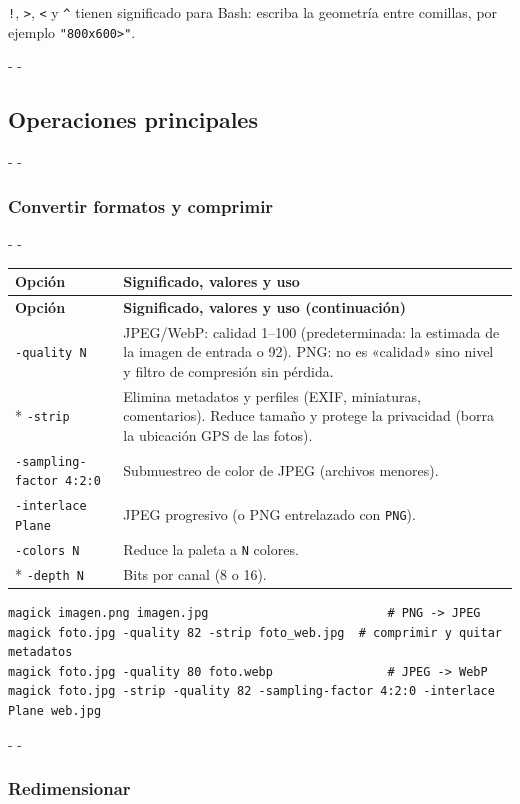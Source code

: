 \documentclass[11pt,a4paper]{article}
\makeatletter
\newcommand{\necesitaespacio}[1]{\par\penalty-100\begingroup
	\setlength{\dimen@}{#1}\dimen@ii\pagegoal\advance\dimen@ii-\pagetotal
	\ifdim\dimen@>\dimen@ii\ifdim\dimen@ii>\z@\vfil\fi\penalty-\@M\fi\endgroup}
\newenvironment{opciones}[1][Opción]{%
	\par\begingroup\small
	\begin{longtable}{L{4.25cm}L{11.2cm}}
		\toprule\rowcolor{tablacab}\cab{#1} & \cab{Significado, valores y uso} \\ \midrule
		\endfirsthead
		\toprule\rowcolor{tablacab}\cab{#1} & \cab{Significado, valores y uso (continuación)} \\ \midrule
		\endhead
		\bottomrule
		\endfoot}
	{\end{longtable}\endgroup}
\newcommand{\opt}[1]{\texttt{\textcolor{colopt}{#1}}}      %
\newcommand{\val}[1]{\texttt{#1}}                          %
\newcommand{\cab}[1]{\textbf{#1}}
\makeatother
\begin{document}
	\begin{advertencia}
		\val{!}, \val{>}, \val{<} y \val{\^{}} tienen significado para Bash: escriba la geometría entre comillas, por ejemplo \val{"800x600>"}.
	\end{advertencia}
	
	\necesitaespacio{25\baselineskip}
	\subsection{Operaciones principales}
	
	\necesitaespacio{22\baselineskip}
	\subsubsection{Convertir formatos y comprimir}
	
	\necesitaespacio{18\baselineskip}
	\begin{opciones}
		\opt{-quality N} & JPEG/WebP: calidad 1--100 (predeterminada: la estimada de la imagen de entrada o 92). PNG: no es «calidad» sino nivel y filtro de compresión sin pérdida.\\*
		\opt{-strip} & Elimina metadatos y perfiles (EXIF, miniaturas, comentarios). Reduce tamaño y protege la privacidad (borra la ubicación GPS de las fotos).\\
		\opt{-sampling-\allowbreak{}factor 4:2:0} & Submuestreo de color de JPEG (archivos menores).\\
		\opt{-interlace Plane} & JPEG progresivo (o PNG entrelazado con \val{PNG}).\\
		\opt{-colors N} & Reduce la paleta a \val{N} colores.\\*
		\opt{-depth N} & Bits por canal (8 o 16).\\
	\end{opciones}
	
	\begin{lstlisting}
magick imagen.png imagen.jpg                         # PNG -> JPEG
magick foto.jpg -quality 82 -strip foto_web.jpg  # comprimir y quitar metadatos
magick foto.jpg -quality 80 foto.webp                # JPEG -> WebP
magick foto.jpg -strip -quality 82 -sampling-factor 4:2:0 -interlace Plane web.jpg
\end{lstlisting}
	
	\necesitaespacio{18\baselineskip}
	\subsubsection{Redimensionar}
	
\end{document}
